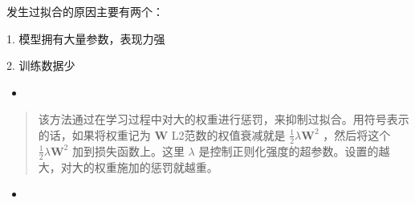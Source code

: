 \documentclass[letterpaper,10pt,english]{sphinxmanual}
\begin{document}
\begin{DUlineblock}{0em}
\item[] 发生过拟合的原因主要有两个：
\item[] 1. 模型拥有大量参数，表现力强
\item[] 2. 训练数据少
\item[] 
\end{DUlineblock}
\begin{itemize}
\item {} 

\end{itemize}
\begin{quote}

该方法通过在学习过程中对大的权重进行惩罚，来抑制过拟合。用符号表示的话，如果将权重记为
\(\pmb{W}\)
L2范数的权值衰减就是
\(\frac{1}{2}\lambda\pmb{W}^{2}\)
，然后将这个
\(\frac{1}{2}\lambda\pmb{W}^{2}\)
加到损失函数上。这里
\(\lambda\)
是控制正则化强度的超参数。设置的越大，对大的权重施加的惩罚就越重。
\end{quote}
\begin{itemize}
\item {} 

\end{itemize}
\end{document}
